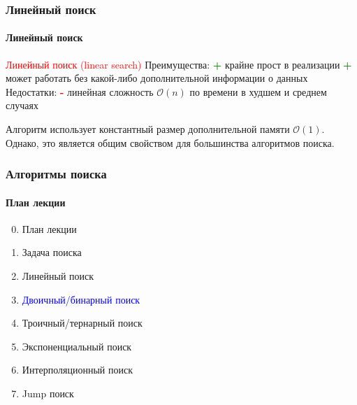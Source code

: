 \documentclass[aspectratio=169]{beamer}
\begin{document}
\begin{frame}
\frametitle{Линейный поиск}
\framesubtitle{Линейный поиск}
\justifying
\textcolor{red}{Линейный поиск (linear search)} \newline\newline
Преимущества:\newline
\textcolor{green} {\textbf{+}} крайне прост в реализации\newline
\textcolor{green} {\textbf{+}} может работать без какой-либо дополнительной информации о данных\newline\newline
Недостатки:\newline
\textcolor{red} {\textbf{-}} линейная сложность $\mathcal{O}(n)$ по времени в худшем и среднем случаях\newline

Алгоритм использует константный размер дополнительной памяти $\mathcal{O}(1)$. \newline Однако, это является общим свойством для большинства алгоритмов поиска.
\end{frame}

\begin{frame}
\frametitle{Алгоритмы поиска}
\framesubtitle{План лекции}

\begin{enumerate}
  \setcounter{enumi}{-1}
  \item{План лекции}
  \item{Задача поиска}
  \item{Линейный поиск}
  \item{\textcolor{blue}{Двоичный/бинарный поиск}}
  \item{Троичный/тернарный поиск}
  \item{Экспоненциальный поиск}
  \item{Интерполяционный поиск}
  \item{Jump поиск}
\end{enumerate}
\end{frame}
\end{document}
